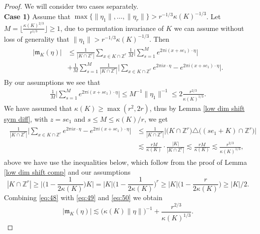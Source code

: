 \documentclass[a4paper,oneside, reqno]{amsart}
\numberwithin{equation}{section}
\theoremstyle{definition}%
\theoremstyle{definition}
\theoremstyle{definition}%
\theoremstyle{definition}
\newcommand{\Z}{\mathbb{Z}}
\begin{document}
\begin{proof}
We will consider two cases separately.
\\
\textbf{Case 1)} Assume that
$\max\{\|\eta_1\|,\ldots,\|\eta_r\|\}>r^{-1/3} \kappa(K)^{-1/3}$.  Let $M=\big\lfloor
\frac{\kappa(K)^{2/3}}{r^{1/3}}\big\rfloor \ge 1$, due to permutation invariance of $K$ we can assume without loss of generality that $\|\eta_1\|>r^{-1/3} \kappa(K)^{-1/3}$. Then
\begin{align}
  \label{eq:48}
  \begin{split}
  |\mathfrak m_K(\eta)|&\le
  \frac{1}{|K\cap\Z^r|}\sum_{x\in
  K\cap\Z^r}\frac{1}{M}\Big|\sum_{s=1}^Me^{2\pi i
  (x+se_1)\cdot\eta}\Big|\\
&+\frac{1}{M}\sum_{s=1}^M\frac{1}{|K\cap\Z^r|}\Big|\sum_{x\in
  K\cap\Z^r}e^{2\pi i
  x\cdot\eta}-e^{2\pi i
  (x+se_1)\cdot\eta}\Big|.
  \end{split}
\end{align}
By our assumptions we see that
\begin{align}
  \label{eq:49}
\frac{1}{M}\Big|\sum_{s=1}^Me^{2\pi i
  (x+se_1)\cdot\eta}\Big|\le M^{-1}\|\eta_1\|^{-1}\le
2 \frac{r^{2/3}}{\kappa(K)^{1/3}}.  
\end{align}
We have assumed that $\kappa(K) \ge \max(r^2,2r)$, thus by Lemma \ref{low dim shift sym diff}, with $z=se_1$
 and $s\le M\le \kappa(K)/r$, we get
 \begin{align}
   \label{eq:50}
   \begin{split}
   \frac{1}{|K\cap\Z^r|}\Big|\sum_{x\in
  K\cap\Z^r}e^{2\pi i
  x\cdot\eta}-e^{2\pi i
  (x+se_1)\cdot\eta}\Big|&\le\frac{1}{|K\cap\Z^r|}\big|\big(K\cap\Z^r\big)\triangle\big((se_1+K)\cap\Z^r\big)\big|\\
                         &\lesssim  \frac{rM}{\kappa(K)} \cdot \frac{|K|}{|K \cap \Z^r|} \lesssim \frac{rM}{\kappa(K)} \lesssim \frac{r^{2/3}}{\kappa(K)^{1/3}},
   \end{split}
 \end{align}
 above we have use the inequalities below, which follow from the proof of Lemma \ref{low dim shift comp} and our assumptions
 \begin{equation} \label{eq:5.12}
|K\cap\Z^r|\ge \Big|\Big(1-\frac{1}{2\kappa(K)}\Big)K\Big|=|K|\bigg(1-\frac{1}{2\kappa(K)}\bigg)^r\ge
|K|\Big(1-\frac{r}{2\kappa(K)}\Big)\ge|K|/2.
 \end{equation}
Combining \eqref{eq:48} with \eqref{eq:49} and \eqref{eq:50} we obtain
\begin{equation*}
|\mathfrak m_K(\eta)|\lesssim \big(\kappa(K)\|\eta\|\big)^{-1}+ \frac{r^{2/3}}{\kappa(K)^{1/3}}.

\end{equation*}
\end{proof}
\end{document}
